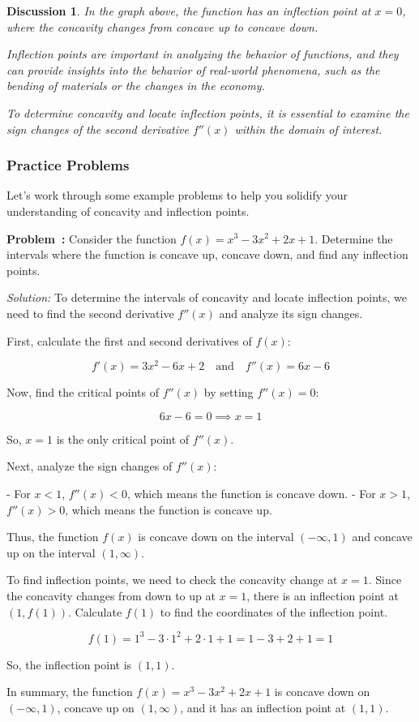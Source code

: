 \documentclass[a4paper,12pt]{book}
\newcounter{problem}
\newenvironment{problem}[1][\theproblem]
{\refstepcounter{problem}\par\medskip\noindent\textbf{Problem~#1:} \rmfamily}{\medskip}
\newenvironment{solution}[1][]
{\par\noindent\textit{Solution:} \rmfamily}{\medskip}
\newcounter{example}
\newtheorem{discussion}{Discussion}
\begin{document}
\begin{discussion}
In the graph above, the function has an inflection point at \(x = 0\), where the concavity changes from concave up to concave down.

Inflection points are important in analyzing the behavior of functions, and they can provide insights into the behavior of real-world phenomena, such as the bending of materials or the changes in the economy.

To determine concavity and locate inflection points, it is essential to examine the sign changes of the second derivative \(f''(x)\) within the domain of interest.
\end{discussion}

\subsubsection*{Practice Problems}

Let's work through some example problems to help you solidify your understanding of concavity and inflection points.

\begin{problem}
Consider the function \(f(x) = x^3 - 3x^2 + 2x + 1\). Determine the intervals where the function is concave up, concave down, and find any inflection points.
\end{problem}

\begin{solution}
To determine the intervals of concavity and locate inflection points, we need to find the second derivative \(f''(x)\) and analyze its sign changes.

First, calculate the first and second derivatives of \(f(x)\):

\[
f'(x) = 3x^2 - 6x + 2 \quad \text{and} \quad f''(x) = 6x - 6
\]

Now, find the critical points of \(f''(x)\) by setting \(f''(x) = 0\):

\[
6x - 6 = 0 \implies x = 1
\]

So, \(x = 1\) is the only critical point of \(f''(x)\).

Next, analyze the sign changes of \(f''(x)\):

- For \(x < 1\), \(f''(x) < 0\), which means the function is concave down.
- For \(x > 1\), \(f''(x) > 0\), which means the function is concave up.

Thus, the function \(f(x)\) is concave down on the interval \((- \infty, 1)\) and concave up on the interval \((1, \infty)\).

To find inflection points, we need to check the concavity change at \(x = 1\). Since the concavity changes from down to up at \(x = 1\), there is an inflection point at \((1, f(1))\). Calculate \(f(1)\) to find the coordinates of the inflection point.

\[
f(1) = 1^3 - 3 \cdot 1^2 + 2 \cdot 1 + 1 = 1 - 3 + 2 + 1 = 1
\]

So, the inflection point is \((1, 1)\).

In summary, the function \(f(x) = x^3 - 3x^2 + 2x + 1\) is concave down on \((- \infty, 1)\), concave up on \((1, \infty)\), and it has an inflection point at \((1, 1)\).
\end{solution}
\end{document}
